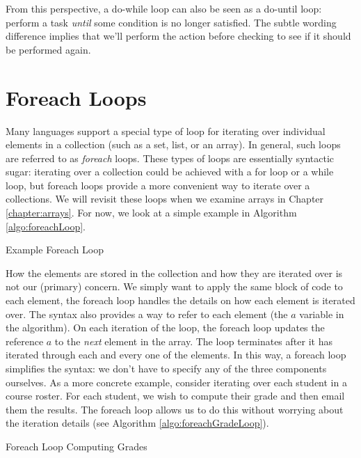 From this perspective, a do-while loop can also be seen as a do-until loop: perform a task
\emph{until} some condition is no longer satisfied.  The subtle wording difference implies that
we'll perform the action before checking to see if it should be performed again.

\section{Foreach Loops}
\label{section:foreachLoops}

Many languages support a special type of loop for iterating over individual elements in 
a collection (such as a set, list, or an array).  In general, such loops are referred to as \emph{foreach}
loops.  These types of loops are essentially \gls{syntactic sugar}: iterating over a collection
could be achieved with a for loop or a while loop, but foreach loops provide a more
convenient way to iterate over a collections.  We will revisit these loops
when we examine arrays in Chapter \ref{chapter:arrays}.  For now, we look at a simple example
in Algorithm \ref{algo:foreachLoop}.

\begin{algorithm}[h]
\caption{Example Foreach Loop}
\label{algo:foreachLoop}
\end{algorithm}

How the elements are stored in the collection and how they are iterated over is not our 
(primary) concern.  We simply want to apply the same block of code to each element, 
the foreach loop handles the details on how each element is iterated over.  The syntax
also provides a way to refer to each element (the $a$ variable in the algorithm).  On
each iteration of the loop, the foreach loop updates the reference $a$ to the \emph{next}
element in the array.  The loop terminates after it has iterated through each and every
one of the elements.  In this way, a foreach loop simplifies the syntax: we don't have to 
specify any of the three components ourselves.  As a more
concrete example, consider iterating over each student in a course roster.  For each
student, we wish to compute their grade and then email them the results.  The foreach
loop allows us to do this without worrying about the iteration details (see Algorithm 
\ref{algo:foreachGradeLoop}).

\begin{algorithm}[h]
\caption{Foreach Loop Computing Grades}
\label{algo:foreachGradeLoop}
\end{algorithm}

